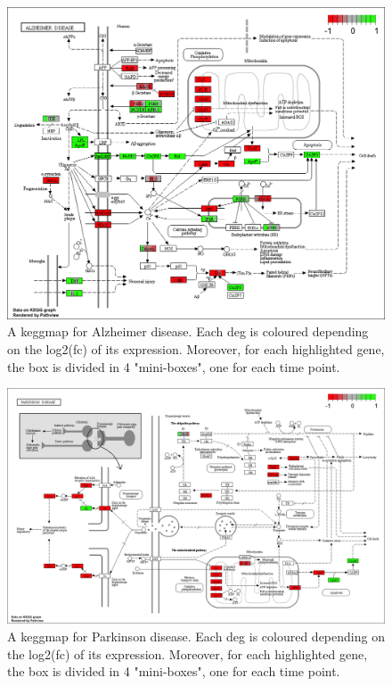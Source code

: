 \begin{figure}[H]
\centering
\includegraphics[width=\textwidth, keepaspectratio]{img/ticorser/functional/alzheimer.png}
\caption[ticorser alzheimer keggmap]{A keggmap for Alzheimer disease. Each \gls{deg} is coloured depending on the log2(fc) of its expression. Moreover, for each highlighted gene, the box is divided in 4 "mini-boxes", one for each time point.}
\label{fig:ticorseralzheimer}
\end{figure}

\begin{figure}[H]
\centering
\includegraphics[width=\textwidth, keepaspectratio]{img/ticorser/functional/parkinson.png}
\caption[ticorser parkinson keggmap]{A keggmap for Parkinson disease. Each \gls{deg} is coloured depending on the log2(fc) of its expression. Moreover, for each highlighted gene, the box is divided in 4 "mini-boxes", one for each time point.}
\label{fig:ticorserparkinson}
\end{figure}






